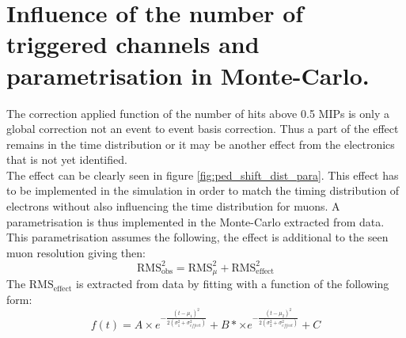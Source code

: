 \chapter{Influence of the number of triggered channels and parametrisation in Monte-Carlo.}
\label{appendix:ped_shift}

The correction applied function of the number of hits above 0.5 MIPs is only a global correction not an event to event basis correction. Thus a part of the effect remains in the time distribution or it may be another effect from the electronics that is not yet identified.\\
The effect can be clearly seen in figure \ref{fig:ped_shift_dist_para}. This effect has to be implemented in the simulation in order to match the timing distribution of electrons without also influencing the time distribution for muons. A parametrisation is thus implemented in the Monte-Carlo extracted from data. This parametrisation assumes the following, the effect is additional to the seen muon resolution giving then:
\begin{equation*}
	\text{RMS}_{\text{obs}}^2 = \text{RMS}_{\mu}^2 + \text{RMS}_{\text{effect}}^2
\end{equation*}
The $\text{RMS}_{\text{effect}}$ is extracted from data by fitting with a function of the following form:
\begin{equation*}
	f(t) = A \times e^{-\frac{(t-\mu_1)^2}{2(\sigma_1^2 + \sigma_{effect}^2)}} + B* \times e^{-\frac{(t-\mu_2)^2}{2(\sigma_2^2 + \sigma_{effect}^2)}} + C
\end{equation*}

